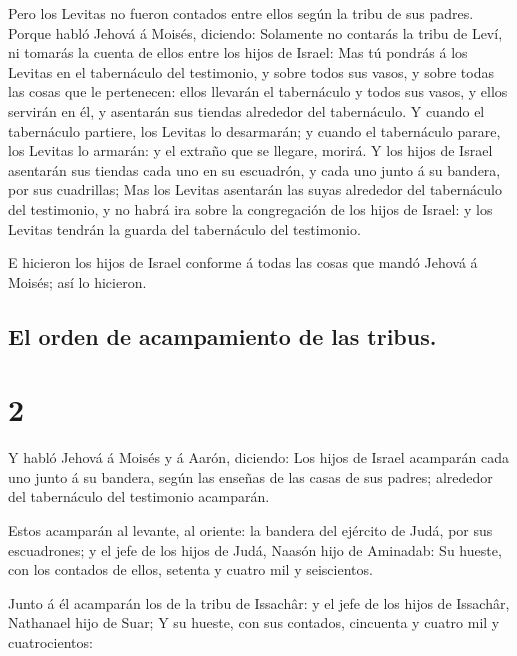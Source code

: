  Pero los Levitas no fueron contados entre ellos según la
tribu de sus padres.  Porque habló Jehová á Moisés,
diciendo:  Solamente no contarás la tribu de Leví, ni
tomarás la cuenta de ellos entre los hijos de Israel:  Mas
tú pondrás á los Levitas en el tabernáculo del testimonio, y sobre todos
sus vasos, y sobre todas las cosas que le pertenecen: ellos llevarán el
tabernáculo y todos sus vasos, y ellos servirán en él, y asentarán sus
tiendas alrededor del tabernáculo.  Y cuando el tabernáculo
partiere, los Levitas lo desarmarán; y cuando el tabernáculo parare, los
Levitas lo armarán: y el extraño que se llegare, morirá.  Y
los hijos de Israel asentarán sus tiendas cada uno en su escuadrón, y
cada uno junto á su bandera, por sus cuadrillas;  Mas los
Levitas asentarán las suyas alrededor del tabernáculo del testimonio, y
no habrá ira sobre la congregación de los hijos de Israel: y los Levitas
tendrán la guarda del tabernáculo del testimonio.

 E hicieron los hijos de Israel conforme á todas las cosas
que mandó Jehová á Moisés; así lo hicieron.

\hypertarget{el-orden-de-acampamiento-de-las-tribus.}{%
\subsection{El orden de acampamiento de las
tribus.}\label{el-orden-de-acampamiento-de-las-tribus.}}

\hypertarget{section-1}{%
\section{2}\label{section-1}}

 Y habló Jehová á Moisés y á Aarón, diciendo: 
Los hijos de Israel acamparán cada uno junto á su bandera, según las
enseñas de las casas de sus padres; alrededor del tabernáculo del
testimonio acamparán.

 Estos acamparán al levante, al oriente: la bandera del
ejército de Judá, por sus escuadrones; y el jefe de los hijos de Judá,
Naasón hijo de Aminadab:  Su hueste, con los contados de
ellos, setenta y cuatro mil y seiscientos.

 Junto á él acamparán los de la tribu de Issachâr: y el jefe
de los hijos de Issachâr, Nathanael hijo de Suar;  Y su
hueste, con sus contados, cincuenta y cuatro mil y cuatrocientos:

